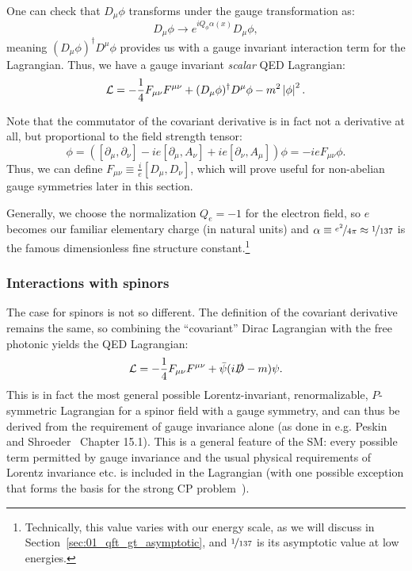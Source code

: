 One can check that $D_\mu\phi$ transforms under the gauge transformation as:
\begin{equation}
	\label{eq:01_qft_gt_maxwell_covariant_derivative_gauge}
	D_\mu\phi \rightarrow e^{iQ_\phi\alpha(x)}D_\mu\phi,
\end{equation}
meaning $(D_\mu\phi)^\dagger D^\mu\phi$ provides us with a gauge invariant interaction term for the Lagrangian.
Thus, we have a gauge invariant \textit{scalar} QED Lagrangian:
\begin{equation}
	\label{eq:01_qft_gt_maxwell_scalar_lagrangian}
	\mathcal L = -\frac{1}{4}F_{\mu\nu}F^{\mu\nu} + (D_\mu\phi)^\dagger D^\mu\phi - m^2\left\lvert \phi \right\rvert^2.
\end{equation}

Note that the commutator of the covariant derivative is in fact not a derivative at all, but proportional to the field strength tensor:
\begin{equation}
	[D_\mu, D_\nu]\phi = ([\partial_\mu, \partial_\nu] - ie[\partial_\mu, A_\nu] + ie[\partial_\nu, A_\mu])\phi = -ieF_{\mu\nu}\phi.
\end{equation}
Thus, we can define $F_{\mu\nu} \equiv \frac{i}{e}[D_\mu, D_\nu]$, which will prove useful for non-abelian gauge symmetries later in this section.

Generally, we choose the normalization $Q_e = -1$ for the electron field, so $e$ becomes our familiar elementary charge (in natural units) and $\alpha\equiv\cnicefrac{e^2}{4\pi} \approx \cnicefrac{1}{137}$ is the famous dimensionless fine structure constant.\footnote{Technically, this value varies with our energy scale, as we will discuss in Section~\ref{sec:01_qft_gt_asymptotic}, and $\cnicefrac{1}{137}$ is its asymptotic value at low energies.}

\subsubsection{Interactions with spinors}

The case for spinors is not so different. 
The definition of the covariant derivative remains the same, so combining the ``covariant'' Dirac Lagrangian with the free photonic yields the QED Lagrangian:
\begin{equation}
	\label{eq:01_qft_gt_maxwell_qed_lagrangian}
	\mathcal L = -\frac{1}{4}F_{\mu\nu}F^{\mu\nu} + \bar\psi(i\cslashed D - m)\psi.
\end{equation}
This is in fact the most general possible Lorentz-invariant, renormalizable, $P$-symmetric Lagrangian for a spinor field with a \UU[1] gauge symmetry, and can thus be derived from the requirement of gauge invariance alone (as done in e.g. Peskin and Shroeder~\cite{Peskin:1995ev} Chapter 15.1).
This is a general feature of the SM: every possible term permitted by gauge invariance and the usual physical requirements of Lorentz invariance etc. is included in the Lagrangian (with one possible exception that forms the basis for the strong CP problem~\cite{Wu:1991rw,Mannel:2007zz}).

